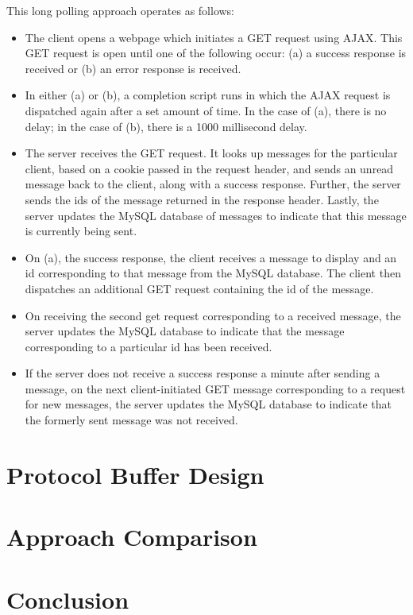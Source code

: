 \documentclass[11pt]{article} %
\begin{document}

 This long polling approach operates as follows: 

\begin{itemize}
\item The client opens a webpage which initiates a GET request using AJAX. This GET request is open until one of the following occur: (a) a success response is received or (b) an error response is received. 
\item In either (a) or (b), a completion script runs in which the AJAX request is dispatched again after a set amount of time. In the case of (a), there is no delay; in the case of (b), there is a 1000 millisecond delay. 
\item The server receives the GET request. It looks up messages for the particular client, based on a cookie passed in the request header, and sends an unread message back to the client, along with a success response. Further, the server sends the ids of the message returned in the response header. Lastly, the server updates the MySQL database of messages to indicate that this message is currently being sent. 
\item On (a), the success response, the client receives a message to display and an id corresponding to that message from the MySQL database. The client then dispatches an additional GET request containing the id of the message. 
\item On receiving the second get request corresponding to a received message, the server updates the MySQL database to indicate that the message corresponding to a particular id has been received. 
\item If the server does not receive a success response a minute after sending a message, on the next client-initiated GET message corresponding to a request for new messages, the server updates the MySQL database to indicate that the formerly sent message was not received. 
\end{itemize} 

\section{Protocol Buffer Design}

\section{Approach Comparison} 

\section{Conclusion} 
\end{document}

